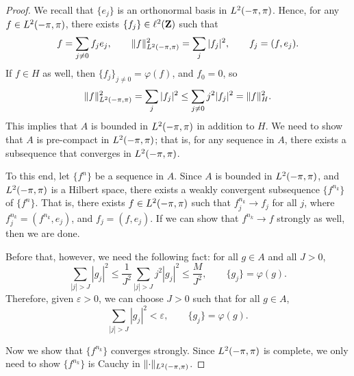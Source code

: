 \documentclass{homework}
\begin{document}
\begin{arabicparts}
\begin{proof}
			We recall that $\{e_j\}$ is an orthonormal basis in ${L^2(-\pi,\pi)}$. Hence, for any $f \in {L^2(-\pi,\pi)}$, there exists $\{f_j\}\in\ell^2(\textbf{Z})$ such that
			\begin{equation}
				f = \sum_{j\ne 0}f_je_j,\qquad  \lVert f\rVert_{L^2(-\pi,\pi)}^2 = \sum_{j} |f_j|^2, \qquad f_j = (f,e_j).
			\end{equation}
			If $f \in H$ as well, then $\{f_j\}_{j\ne0} = \varphi(f)$, and $f_0 = 0$, so
			\begin{equation}
				\lVert f\rVert_{L^2(-\pi,\pi)}^2 = \sum_{j}|f_j|^2 \le \sum_{j\ne 0}j^2|f_j|^2 = \lVert f\rVert_H^2.
			\end{equation}
			This implies that $A$ is bounded in ${L^2(-\pi,\pi)}$ in addition to $H$. We need to show that $A$ is pre-compact in ${L^2(-\pi,\pi)}$; that is, for any sequence in $A$, there exists a subsequence that converges in ${L^2(-\pi,\pi)}$.
			
			To this end, let $\{f^n\}$ be a sequence in $A$. Since $A$ is bounded in ${L^2(-\pi,\pi)}$, and ${L^2(-\pi,\pi)}$ is a Hilbert space, there exists a weakly convergent subsequence $\{f^{n_k}\}$ of $\{f^n\}$. That is, there exists $f \in {L^2(-\pi,\pi)}$ such that $f^{n_k}_j \to f_j$ for all $j$, where $f^{n_k}_j = (f^{n_k},e_j)$, and $f_j = (f,e_j)$. If we can show that $f^{n_k}\to f$ strongly as well, then we are done.
			
			Before that, however, we need the following fact: for all $g \in A$ and all $J > 0$,
			\begin{equation}
				\sum_{|j|> J} |g_j|^2 \le \frac{1}{J^2}\sum_{|j| > J}j^2|g_j|^2 \le \frac{M}{J^2}, \qquad \{g_j\} = \varphi(g).
			\end{equation}
			Therefore, given $\varepsilon > 0$, we can choose $J > 0$ such that for all $g \in A$,
			\begin{equation}
				\label{eq:uniform_tails}
				\sum_{|j| > J}|g_j|^2 < \varepsilon, \qquad \{g_j\}=\varphi(g).
			\end{equation}
			
			Now we show that $\{f^{n_k}\}$ converges strongly. Since ${L^2(-\pi,\pi)}$ is complete, we only need to show $\{f^{n_k}\}$ is Cauchy in $\lVert\cdot\rVert_{L^2(-\pi,\pi)}$.
			

\end{proof}
\end{arabicparts}
\end{document}
